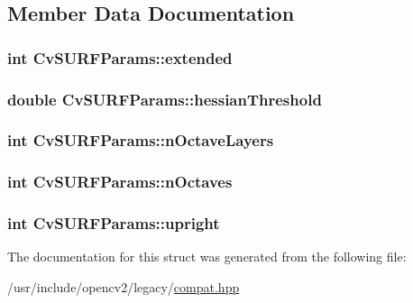 \subsection{Member Data Documentation}
\hypertarget{structCvSURFParams_ae5ee86578ccbc8a56ad0174735404479}{
\subsubsection[{extended}]{\setlength{\rightskip}{0pt plus 5cm}int Cv\-S\-U\-R\-F\-Params\-::extended}}\label{structCvSURFParams_ae5ee86578ccbc8a56ad0174735404479}
\hypertarget{structCvSURFParams_a57e3919e8bda581f2c7f8d2120056c40}{
\subsubsection[{hessian\-Threshold}]{\setlength{\rightskip}{0pt plus 5cm}double Cv\-S\-U\-R\-F\-Params\-::hessian\-Threshold}}\label{structCvSURFParams_a57e3919e8bda581f2c7f8d2120056c40}
\hypertarget{structCvSURFParams_a6be1eb644274f0ba5fd650e656dc2524}{
\subsubsection[{n\-Octave\-Layers}]{\setlength{\rightskip}{0pt plus 5cm}int Cv\-S\-U\-R\-F\-Params\-::n\-Octave\-Layers}}\label{structCvSURFParams_a6be1eb644274f0ba5fd650e656dc2524}
\hypertarget{structCvSURFParams_a5d5f0670389c197ece9b188775600ce6}{
\subsubsection[{n\-Octaves}]{\setlength{\rightskip}{0pt plus 5cm}int Cv\-S\-U\-R\-F\-Params\-::n\-Octaves}}\label{structCvSURFParams_a5d5f0670389c197ece9b188775600ce6}
\hypertarget{structCvSURFParams_a0cbaaf84ed071756eb0c1354bf05ed79}{
\subsubsection[{upright}]{\setlength{\rightskip}{0pt plus 5cm}int Cv\-S\-U\-R\-F\-Params\-::upright}}\label{structCvSURFParams_a0cbaaf84ed071756eb0c1354bf05ed79}


The documentation for this struct was generated from the following file\-:\begin{DoxyCompactItemize}
\item 
/usr/include/opencv2/legacy/\hyperlink{compat_8hpp}{compat.\-hpp}\end{DoxyCompactItemize}
